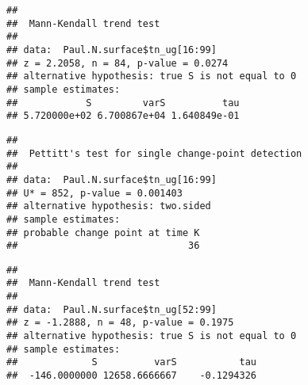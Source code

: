 \documentclass[]{article}
\newenvironment{Shaded}{\begin{snugshade}}{\end{snugshade}}
\newcommand{\KeywordTok}[1]{\textcolor[rgb]{0.13,0.29,0.53}{\textbf{#1}}}
\newcommand{\DecValTok}[1]{\textcolor[rgb]{0.00,0.00,0.81}{#1}}
\newcommand{\CommentTok}[1]{\textcolor[rgb]{0.56,0.35,0.01}{\textit{#1}}}
\newcommand{\OperatorTok}[1]{\textcolor[rgb]{0.81,0.36,0.00}{\textbf{#1}}}
\newcommand{\NormalTok}[1]{#1}
\begin{document}
\begin{Shaded}
\end{Shaded}

\begin{verbatim}
## 
##  Mann-Kendall trend test
## 
## data:  Paul.N.surface$tn_ug[16:99]
## z = 2.2058, n = 84, p-value = 0.0274
## alternative hypothesis: true S is not equal to 0
## sample estimates:
##            S         varS          tau 
## 5.720000e+02 6.700867e+04 1.640849e-01
\end{verbatim}

\begin{Shaded}
\end{Shaded}

\begin{verbatim}
## 
##  Pettitt's test for single change-point detection
## 
## data:  Paul.N.surface$tn_ug[16:99]
## U* = 852, p-value = 0.001403
## alternative hypothesis: two.sided
## sample estimates:
## probable change point at time K 
##                              36
\end{verbatim}

\begin{Shaded}
\end{Shaded}

\begin{verbatim}
## 
##  Mann-Kendall trend test
## 
## data:  Paul.N.surface$tn_ug[52:99]
## z = -1.2888, n = 48, p-value = 0.1975
## alternative hypothesis: true S is not equal to 0
## sample estimates:
##             S          varS           tau 
##  -146.0000000 12658.6666667    -0.1294326
\end{verbatim}
\end{document}
